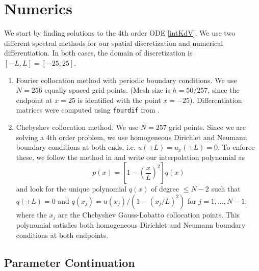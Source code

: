 \documentclass[12pt]{article}
\begin{document}
\section{Numerics}

We start by finding solutions to the 4th order ODE \eqref{intKdV}. We use two different spectral methods for our spatial discretization and numerical differentiation. In both cases, the domain of discretization is $[-L, L] = [-25, 25]$.

\begin{enumerate}
	\item Fourier collocation method with periodic boundary conditions. We use $N = 256$ equally spaced grid points. (Mesh size is $h = 50 / 257$, since the endpoint at $x = 25$ is identified with the point $x = -25$). Differentiation matrices were computed using \texttt{fourdif} from \cite{Weideman2000}.
	\item Chebyshev collocation method. We use $N = 257$ grid points. Since we are solving a 4th order problem, we use homogeneous Dirichlet and Neumann boundary conditions at both ends, i.e. $u(\pm L) = u_x(\pm L) = 0$. To enforce these, we follow the method in \cite{Trefethen2000} and write our interpolation polynomial as
	\begin{equation}
		p(x) = \left[ 1 - \left(\frac{x}{L}\right)^2\right]q(x)
	\end{equation}
	and look for the unique polynomial $q(x)$ of degree $\leq N-2$ such that $q(\pm L) = 0$ and $q(x_j) = u(x_j) / (1 - (x_j / L)^2)$ for $j = 1, \dots, N-1$, where the $x_j$ are the Chebyshev Gauss-Lobatto collocation points. This polynomial satisfies both homogeneous Dirichlet and Neumann boundary conditions at both endpoints.
\end{enumerate}

\subsection{Parameter Continuation}
\end{document}
